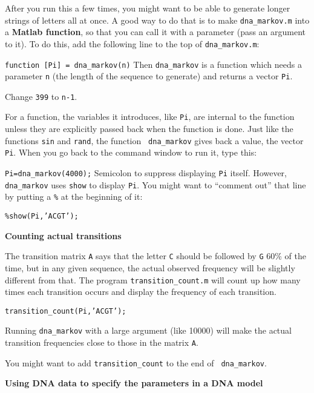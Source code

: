 After you run this a few times, you might want to be able to generate
longer strings of letters all at once.
A good way to do that is to make {\tt dna\_markov.m} into a {\bf Matlab
function}, so that you can call it with a parameter (pass an argument to
it).
To do this, add the following line to the top of {\tt dna\_markov.m}:

\item {\tt function [Pi] = dna\_markov(n)} \hfill Then {\tt dna\_markov} is
a function which needs a parameter {\tt n} (the length of the sequence to
generate) and returns a vector {\tt Pi}.
\item Change {\tt 399} to {\tt n-1}.

For a function, the variables it introduces, like {\tt Pi}, are internal to
the function unless they are explicitly passed back when the function is
done.
Just like the functions {\tt sin} and {\tt rand}, the function {\tt
dna\_markov} gives back a value, the vector {\tt Pi}.
When you go back to the command window to run it, type this:

\item {\tt Pi=dna\_markov(4000);} \hfill Semicolon to suppress displaying
{\tt Pi} itself.
However, {\tt dna\_markov} uses {\tt show} to display {\tt Pi}.
You might want to ``comment out'' that line by putting a {\tt \%} at the
beginning of it:

\item {\tt \%show(Pi,'ACGT');} \hfill

\hspace*{-0.5in}
{\bf Counting actual transitions}

The transition matrix {\tt A} says that the letter {\tt C} should be
followed by {\tt G} 60\% of the time, but in any given
sequence, the actual observed frequency will be slightly different from
that.
The program {\tt transition\_count.m} will count up how many times each
transition occurs and display the frequency of each transition.

\item {\tt transition\_count(Pi,'ACGT');} \hfill

Running {\tt dna\_markov} with a large argument (like 10000) will make the
actual transition frequencies close to those in the matrix {\tt A}.

You might want to add {\tt transition\_count} to the end of {\tt
dna\_markov}.

\hspace*{-0.5in}
{\bf Using DNA data to specify the parameters in a DNA model}

